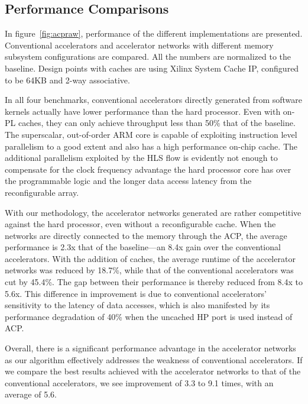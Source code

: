 \documentclass{sig-alternate}
\begin{document}
\subsection{Performance Comparisons}
In figure~\ref{fig:acpraw}, 
performance of the different implementations are presented. 
Conventional accelerators and accelerator networks with different memory subsystem
configurations are compared. All the numbers are normalized to the baseline.
Design points with caches are using Xilinx System Cache IP, configured to be 64KB and 2-way associative.   

In all four benchmarks, conventional accelerators directly generated from software kernels actually have lower performance than the hard processor. Even with
on-PL caches, they can only achieve throughput less than 50\% that of the baseline.
The superscalar, out-of-order ARM core is capable of exploiting instruction level parallelism to a good extent and also has a high performance on-chip cache.
The additional parallelism exploited by the HLS flow is evidently not enough
to compensate for the clock frequency advantage the hard processor core has over the programmable logic and the longer data access latency from the reconfigurable array. 

With our methodology, the accelerator networks generated 
are rather competitive against the hard processor, even
without a reconfigurable cache. When the networks are directly connected to the memory through the ACP, the average performance is 2.3x that of the baseline---an 8.4x gain over the conventional accelerators. 
With the addition of caches,  
the average runtime of the accelerator networks was reduced by 18.7\%,  while that of the conventional accelerators was cut by 45.4\%. The gap between their performance is thereby reduced from 8.4x to 5.6x. This difference in improvement is due to conventional accelerators' sensitivity to the latency of data accesses, which is also manifested by its performance degradation of 40\% when the uncached HP port is used instead of ACP. 

Overall, there is a significant performance advantage in the accelerator networks as our algorithm effectively addresses the weakness of conventional accelerators. If we compare the best results achieved with the
accelerator networks to that of the conventional accelerators, we see improvement
of 3.3 to 9.1 times, with an average of 5.6. 
\end{document}
